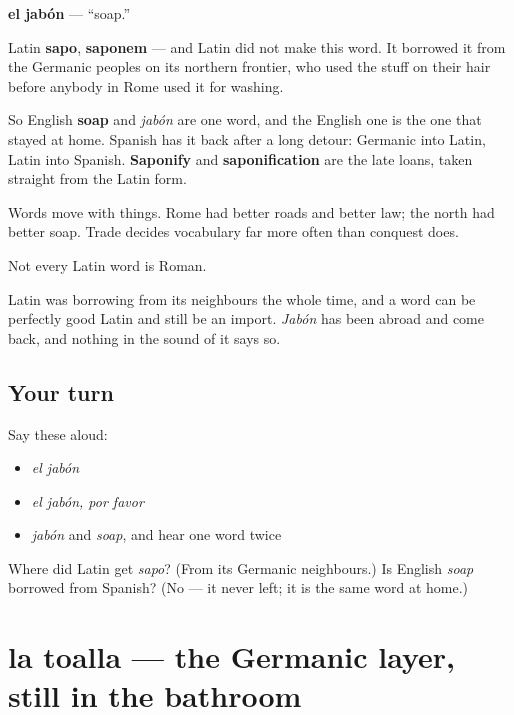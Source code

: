 \begin{cousinweb}
\textbf{el jabón} — \textquotedblleft{}soap.\textquotedblright{}

Latin \textbf{sapo}, \textbf{saponem} — and Latin did not make this word. It borrowed it from the Germanic peoples on its northern frontier, who used the stuff on their hair before anybody in Rome used it for washing.

So English \textbf{soap} and \emph{jabón} are one word, and the English one is the one that stayed at home. Spanish has it back after a long detour: Germanic into Latin, Latin into Spanish. \textbf{Saponify} and \textbf{saponification} are the late loans, taken straight from the Latin form.

Words move with things. Rome had better roads and better law; the north had better soap. Trade decides vocabulary far more often than conquest does.
\end{cousinweb}

\begin{grammarlens}[title={What you've built}]
Not every Latin word is Roman.

Latin was borrowing from its neighbours the whole time, and a word can be perfectly good Latin and still be an import. \emph{Jabón} has been abroad and come back, and nothing in the sound of it says so.
\end{grammarlens}

\subsection*{Your turn}
Say these aloud:

\begin{itemize}
\raggedright
  \item \emph{el jabón}
  \item \emph{el jabón, por favor}
  \item \emph{jabón} and \emph{soap}, and hear one word twice
\end{itemize}

\begin{tcolorbox}[breakable,colback=teal!4,colframe=teal!35!black,title={Before you move on}]
Where did Latin get \emph{sapo}? (From its Germanic neighbours.) Is English \emph{soap} borrowed from Spanish? (No — it never left; it is the same word at home.)
\end{tcolorbox}
\section[la toalla]{la toalla — the Germanic layer, still in the bathroom}

